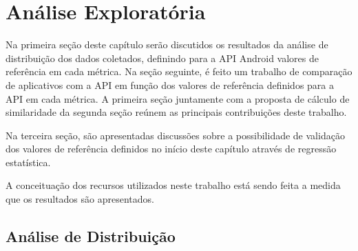 \chapter{Análise Exploratória}
\label{cap:analise_exploratoria}

Na primeira seção deste capítulo serão discutidos os resultados da análise de distribuição dos dados coletados, definindo para a API Android valores de referência em cada métrica. Na seção seguinte, é feito um trabalho de comparação de aplicativos com a API em função dos valores de referência definidos para a API em cada métrica. A primeira seção juntamente com a proposta de cálculo de similaridade da segunda seção reúnem as principais contribuições deste trabalho.

Na terceira seção, são apresentadas discussões sobre a possibilidade de validação dos valores de referência definidos no início deste capítulo através de regressão estatística. 

A conceituação dos recursos utilizados neste trabalho está sendo feita a medida que os resultados são apresentados.

\section{Análise de Distribuição}

